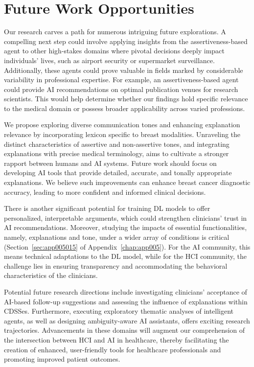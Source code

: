 \section{Future Work Opportunities}
\label{sec:chap007004}

Our research carves a path for numerous intriguing future explorations.
A compelling next step could involve applying insights from the assertiveness-based agent to other high-stakes domains where pivotal decisions deeply impact individuals' lives, such as airport security or supermarket surveillance.
Additionally, these agents could prove valuable in fields marked by considerable variability in professional expertise.
For example, an assertiveness-based agent could provide \ac{AI} recommendations on optimal publication venues for research scientists.
This would help determine whether our findings hold specific relevance to the medical domain or possess broader applicability across varied professions.

We propose exploring diverse communication tones and enhancing explanation relevance by incorporating lexicon specific to breast modalities.
Unraveling the distinct characteristics of assertive and non-assertive tones, and integrating explanations with precise medical terminology, aims to cultivate a stronger rapport between humans and \ac{AI} systems.
Future work should focus on developing \ac{AI} tools that provide detailed, accurate, and tonally appropriate explanations.
We believe such improvements can enhance breast cancer diagnostic accuracy, leading to more confident and informed clinical decisions.

There is another significant potential for training \ac{DL} models to offer personalized, interpretable arguments, which could strengthen clinicians' trust in \ac{AI} recommendations.
Moreover, studying the impacts of essential functionalities, namely, explanations and tone, under a wider array of conditions is critical (Section~\ref{sec:app005015} of Appendix~\ref{chap:app005}).
For the \ac{AI} community, this means technical adaptations to the \ac{DL} model, while for the \ac{HCI} community, the challenge lies in ensuring transparency and accommodating the behavioral characteristics of the clinicians.

Potential future research directions include investigating clinicians' acceptance of \ac{AI}-based follow-up suggestions and assessing the influence of explanations within \acp{CDSSe}.
Furthermore, executing exploratory thematic analyses of intelligent agents, as well as designing ambiguity-aware \ac{AI} assistants, offers exciting research trajectories.
Advancements in these domains will augment our comprehension of the intersection between \ac{HCI} and \ac{AI} in healthcare, thereby facilitating the creation of enhanced, user-friendly tools for healthcare professionals and promoting improved patient outcomes.